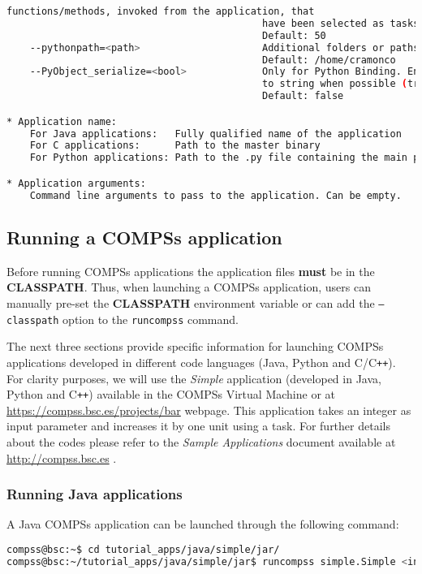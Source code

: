 \begin{lstlisting}[language=bash]
                                            functions/methods, invoked from the application, that 
                                            have been selected as tasks
                                            Default: 50
    --pythonpath=<path>                     Additional folders or paths to add to the PYTHONPATH
                                            Default: /home/cramonco
    --PyObject_serialize=<bool>             Only for Python Binding. Enable the object serialization
                                            to string when possible (true/false).
                                            Default: false

* Application name:
    For Java applications:   Fully qualified name of the application
    For C applications:      Path to the master binary
    For Python applications: Path to the .py file containing the main program

* Application arguments:
    Command line arguments to pass to the application. Can be empty.

\end{lstlisting}

\subsection{Running a COMPSs application}
\label{subsec:running_compss}
Before running COMPSs applications the application files \textbf{must} be in the \textbf{CLASSPATH}.
Thus, when launching a COMPSs application, users can manually pre-set the \textbf{CLASSPATH} environment variable
or can add the \texttt{--classpath} option to the \texttt{runcompss} command.

The next three sections provide specific information for launching COMPSs applications developed in different code languages (Java, Python and 
C/C\texttt{++}). For clarity purposes, we will use the \textit{Simple} application (developed in Java, Python and C\texttt{++}) available in the COMPSs
Virtual Machine or at \url{https://compss.bsc.es/projects/bar} webpage. This application takes an integer as input
parameter and increases it by one unit using a task. For further details about the codes please refer to the \textit{Sample 
Applications} document available at \url{http://compss.bsc.es} .

\subsubsection{Running Java applications}
A Java COMPSs application can be launched through the following command:
\begin{lstlisting}[language=bash]
compss@bsc:~$ cd tutorial_apps/java/simple/jar/
compss@bsc:~/tutorial_apps/java/simple/jar$ runcompss simple.Simple <initial_number>
\end{lstlisting}

